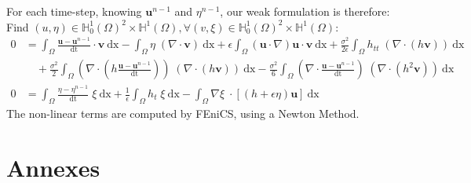\documentclass[11pt,a4paper]{article}
\begin{document}
For each time-step, knowing $\mathbf{u}^{n-1}$ and $\eta^{n-1}$, our weak formulation is therefore: Find $(u,\eta) \in \mathbb{H}^1_0(\Omega)^2 \times \mathbb{H}^1(\Omega), \forall (v,\xi) \in \mathbb{H}^1_0(\Omega)^2 \times \mathbb{H}^1(\Omega)$: 
\begin{equation}
			\begin{split}
				0 &= \int_{\Omega} \! \frac{\mathbf{u} 
					- \mathbf{u}^{n-1}}{\mathrm{dt}} \cdot
					\mathbf{v} \: \mathrm{dx} 
					- \int_{\Omega} \! \eta \; (\nabla \cdot \mathbf{v}) \: \mathrm{dx} + \epsilon \! \int_{\Omega} \! (\mathbf{u} \cdot \nabla ) \mathbf{u} \cdot \mathbf{v} \: \mathrm{dx} + \frac{\sigma^2}{2 \epsilon} \! \int_{\Omega} \!  h_{tt}  \; (\nabla \cdot( h \mathbf{v})) \: \mathrm{dx} \\ 
&\quad + \frac{\sigma^2}{2} \! \int_{\Omega} \!  (\nabla \cdot (h \frac{\mathbf{u} - \mathbf{u}^{n-1}}{\mathrm{dt}})) \; (\nabla \cdot (h \mathbf{v}) )\: \mathrm{dx} - \frac{\sigma^2}{6} \! \int_{\Omega} \! (\nabla \cdot \frac{\mathbf{u} - \mathbf{u}^{n-1}}{\mathrm{dt}}) \; (\nabla  \cdot (h^2  \mathbf{v})) \: \mathrm{dx} \\
\displaystyle 0 &= \int_{\Omega}\! \frac{\eta - \eta^{n-1}}{\mathrm{dt}} \; \xi \: \mathrm{dx} +\frac{1}{\epsilon}\int_{\Omega}\! h_t \; \xi \: \mathrm{dx}
-\int_{\Omega}\! \nabla \xi \; \cdot [(h+\epsilon\eta) \mathbf{u}]  \: \mathrm{dx}
			\end{split}
\end{equation}
The non-linear terms are computed by FEniCS, using a Newton Method.


\pagebreak
\section*{Annexes}
\pagebreak

 


\appendix
\end{document}
